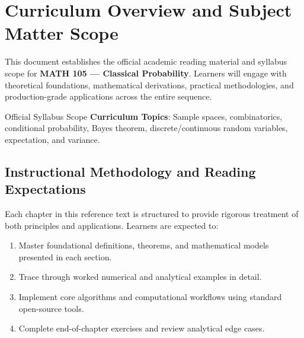 \section{Curriculum Overview and Subject Matter Scope}

This document establishes the official academic reading material and syllabus scope for \textbf{MATH 105 --- Classical Probability}. Learners will engage with theoretical foundations, mathematical derivations, practical methodologies, and production-grade applications across the entire sequence.

\begin{InsightBox}{Official Syllabus Scope}
  \textbf{Curriculum Topics}: Sample spaces, combinatorics, conditional probability, Bayes theorem, discrete/continuous random variables, expectation, and variance.
\end{InsightBox}

\subsection{Instructional Methodology and Reading Expectations}

Each chapter in this reference text is structured to provide rigorous treatment of both principles and applications. Learners are expected to:
\begin{enumerate}
  \item Master foundational definitions, theorems, and mathematical models presented in each section.
  \item Trace through worked numerical and analytical examples in detail.
  \item Implement core algorithms and computational workflows using standard open-source tools.
  \item Complete end-of-chapter exercises and review analytical edge cases.
\end{enumerate}

